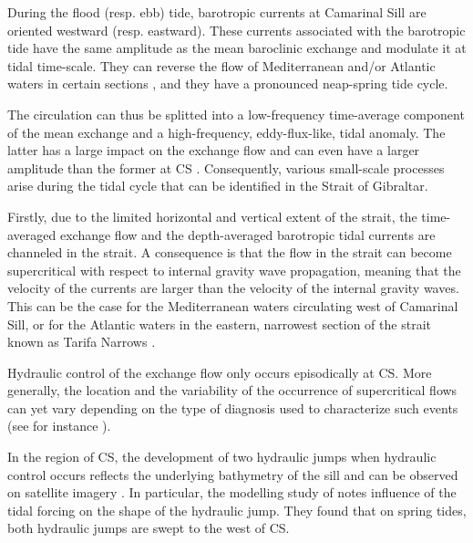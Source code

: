 During the flood (resp. ebb) tide, barotropic currents \color{red}at Camarinal Sill \color{black} are oriented westward (resp. eastward). These currents associated with the barotropic tide have the same amplitude as the mean baroclinic exchange and modulate it at tidal time-scale. They can reverse the flow of Mediterranean and/or Atlantic waters in certain sections \citep{sanchez-roman_2012}, and they have a pronounced neap-spring tide cycle.

The circulation can thus be splitted into a low-frequency time-average component of the mean exchange and a high-frequency, eddy-flux-like, tidal anomaly. The latter has a large impact on the exchange flow \citep{Naranjo2014} and can even have a larger amplitude than the former at CS \citep{vargas_2006}. Consequently, various small-scale processes arise during the tidal cycle that can be identified in the Strait of Gibraltar.

Firstly, due to the limited horizontal and vertical extent of the strait, the time-averaged exchange flow and the depth-averaged barotropic tidal currents are channeled in the strait. A consequence is that the flow in the strait can become supercritical with respect to internal gravity wave propagation, meaning that the velocity of the currents are larger than the velocity of the internal gravity waves. \color{red}This can be the case for the Mediterranean waters circulating west of Camarinal Sill, or for the Atlantic waters in the eastern, narrowest section of the strait known as Tarifa Narrows \citep{FA1988}. \color{black}%

Hydraulic control of the exchange flow only occurs episodically at CS. More generally, the location and the variability of the occurrence of supercritical flows can yet vary depending on the type of diagnosis used to characterize such events (see for instance \citet{FA1988,vargas_2006,sannino_2007,sanchez-roman_2012}). 

In the region of CS, the development of two hydraulic jumps when hydraulic control occurs reflects the underlying bathymetry of the sill and can be observed on satellite imagery \citep{brandt_1996,sanchez-garrido_2011}. In particular, the modelling study of \citet{sanchez-garrido_2011} notes influence of the tidal forcing on the shape of the hydraulic jump. They found that on spring tides, both hydraulic jumps are swept to the west of CS.

